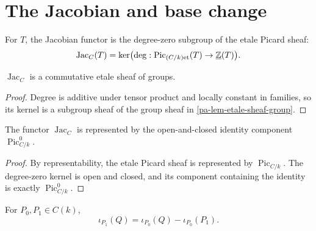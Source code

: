 \chapter{The Jacobian and base change}
\label{pa-ch-jacobian}

\begin{definition}
  \label{pa-def-jacobian-functor}
  \cite{kleiman-picard}
  For \(T\), the Jacobian functor is the degree-zero subgroup of the etale
  Picard sheaf:
  \[
    \operatorname{Jac}_C(T)=
    \ker\bigl(\deg:\operatorname{Pic}_{(C/k)\mathrm{et}}(T)\to\underline{\mathbb Z}(T)\bigr).
  \]
\end{definition}

\begin{lemma}
  \label{pa-lem-jacobian-group-sheaf}
  \cite{kleiman-picard}
  \(\operatorname{Jac}_C\) is a commutative etale sheaf of groups.
\end{lemma}

\begin{proof}
  Degree is additive under tensor product and locally constant in families, so
  its kernel is a subgroup sheaf of the group sheaf in
  \ref{pa-lem-etale-sheaf-group}.
\end{proof}

\begin{lemma}
  \label{pa-lem-jacobian-represented}
  \cite{kleiman-picard}
  The functor \(\operatorname{Jac}_C\) is represented by the open-and-closed
  identity component \(\operatorname{Pic}^0_{C/k}\).
\end{lemma}

\begin{proof}
  By representability, the etale Picard sheaf is represented by
  \(\operatorname{Pic}_{C/k}\).  The degree-zero kernel is open and closed,
  and its component containing the identity is exactly
  \(\operatorname{Pic}^0_{C/k}\).
\end{proof}

\begin{lemma}
  \label{pa-lem-basepoint-translation}
  \cite{milne-av}
  For \(P_0,P_1\in C(k)\),
  \[
    \iota_{P_1}(Q)=\iota_{P_0}(Q)-\iota_{P_0}(P_1).
  \]
\end{lemma}

